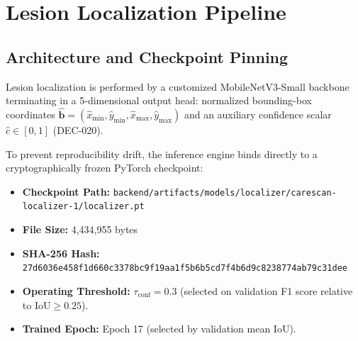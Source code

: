 \documentclass[11pt,a4paper]{report}
\newcommand{\artifact}[1]{\nolinkurl{#1}}
\begin{document}
\chapter{Lesion Localization Pipeline}

\section{Architecture and Checkpoint Pinning}
Lesion localization is performed by a customized MobileNetV3-Small backbone terminating in a 5-dimensional output head: normalized bounding-box coordinates $\hat{\mathbf{b}} = (\hat{x}_\text{min}, \hat{y}_\text{min}, \hat{x}_\text{max}, \hat{y}_\text{max})$ and an auxiliary confidence scalar $\hat{c} \in [0, 1]$ (DEC-020). 

To prevent reproducibility drift, the inference engine binds directly to a cryptographically frozen PyTorch checkpoint:
\begin{itemize}
  \item \textbf{Checkpoint Path:} \artifact{backend/artifacts/models/localizer/carescan-localizer-1/localizer.pt}
  \item \textbf{File Size:} 4,434,955 bytes
  \item \textbf{SHA-256 Hash:} \nolinkurl{27d6036e458f1d660c3378bc9f19aa1f5b6b5cd7f4b6d9c8238774ab79c31dee}
  \item \textbf{Operating Threshold:} $\tau_\text{conf} = 0.3$ (selected on validation F1 score relative to $\text{IoU} \ge 0.25$).
  \item \textbf{Trained Epoch:} Epoch 17 (selected by validation mean IoU).
\end{itemize}
\end{document}
